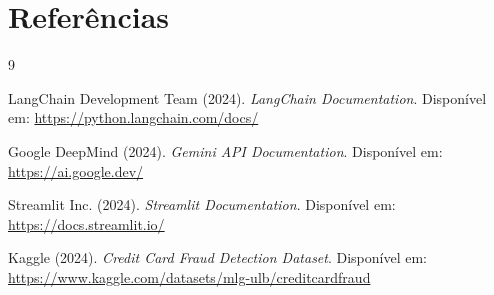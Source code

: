 \documentclass[12pt,a4paper]{article}
\begin{document}
\newpage
\section*{Referências}

\begin{thebibliography}{9}

LangChain Development Team (2024).
\textit{LangChain Documentation}.
Disponível em: \url{https://python.langchain.com/docs/}

Google DeepMind (2024).
\textit{Gemini API Documentation}.
Disponível em: \url{https://ai.google.dev/}

Streamlit Inc. (2024).
\textit{Streamlit Documentation}.
Disponível em: \url{https://docs.streamlit.io/}

Kaggle (2024).
\textit{Credit Card Fraud Detection Dataset}.
Disponível em: \url{https://www.kaggle.com/datasets/mlg-ulb/creditcardfraud}

\end{thebibliography}
\end{document}
